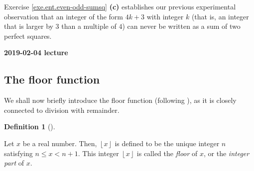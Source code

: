 \documentclass[numbers=enddot,12pt,final,onecolumn,notitlepage]{scrartcl}%
\numberwithin{exer}{subsection}
\theoremstyle{definition}
\newtheorem{defi}[theo]{Definition}
\newenvironment{definition}[1][]
{\begin{defi}[#1]\begin{leftbar}}
{\end{leftbar}\end{defi}}
\begin{document}
Exercise \ref{exe.ent.even-odd-sumsq} \textbf{(c)} establishes our previous
experimental observation that an integer of the form $4k+3$ with integer $k$
(that is, an integer that is larger by $3$ than a multiple of $4$) can never
be written as a sum of two perfect squares.

\begin{center}
\textbf{2019-02-04 lecture}
\end{center}

\subsection{The floor function}

We shall now briefly introduce the floor function (following \cite{floor}), as
it is closely connected to division with remainder.

\begin{definition}
\label{def.ent.floor}Let $x$ be a real number. Then, $\left\lfloor
x\right\rfloor $ is defined to be the unique integer $n$ satisfying $n\leq
x<n+1$. This integer $\left\lfloor x\right\rfloor $ is called the
\textit{floor} of $x$, or the \textit{integer part} of $x$.
\end{definition}
\end{document}
